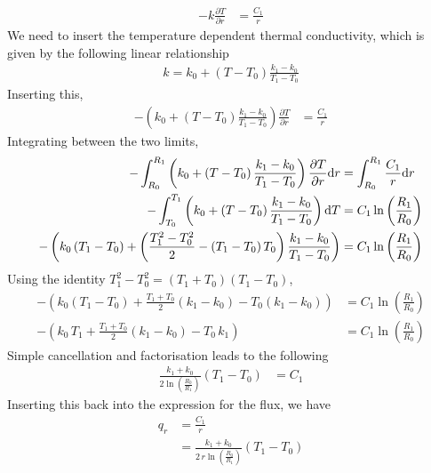 \documentclass[calculator,datasheet,handbook]{exam}
\begin{document}
\begin{question}
\begin{enumerate}[a)]
{      \begin{align*}
        -k \frac{\partial T}{\partial r} &= \frac{C_1}{r}
      \end{align*}
      We need to insert the temperature dependent thermal
      conductivity, which is given by the following linear relationship
      \begin{align*}
        k = k_{0} + \left(T-T_{0}\right)\frac{k_{1}-k_{0}}{T_{1}-T_{0}}
      \end{align*}
      Inserting this,
      \begin{align*}
        -\left(k_{0} + \left(T-T_{0}\right)\frac{k_{1}-k_{0}}{T_{1}-T_{0}}\right) \frac{\partial T}{\partial r} &= \frac{C_1}{r}
      \end{align*}
      Integrating between the two limits,
      \begin{align*}
        -\int_{R_{0}}^{R_{1}}\left(k_{0} + \left(T-T_{0}\right)\frac{k_{1}-k_{0}}{T_{1}-T_{0}}\right) \frac{\partial T}{\partial r}{\rm d}r&= \int_{R_{0}}^{R_{1}}\frac{C_1}{r}{\rm d}r\\
        -\int_{T_{0}}^{T_{1}}\left(k_{0} + \left(T-T_{0}\right)\frac{k_{1}-k_{0}}{T_{1}-T_{0}}\right){\rm d}T&= C_1\ln\left(\frac{R_{1}}{R_{0}}\right)\\
        -\left(k_{0}\left(T_{1}-T_{0}\right) + \left(\frac{T_{1}^2-T_{0}^2}{2}-\left(T_{1}-T_{0}\right)T_{0}\right)\frac{k_{1}-k_{0}}{T_{1}-T_{0}}\right)&= C_1\ln\left(\frac{R_{1}}{R_{0}}\right)
      \end{align*}
      Using the identity $T_{1}^2-T_{0}^2=(T_{1}+T_{0})(T_{1}-T_{0})$,
      \begin{align*}
        -\left(k_{0}\left(T_{1}-T_{0}\right) + \frac{T_{1}+T_{0}}{2}(k_{1}-k_{0})-T_{0}(k_{1}-k_{0})\right)&= C_1\ln\left(\frac{R_{1}}{R_{0}}\right)\\
        -\left(k_{0}\,T_{1} + \frac{T_{1}+T_{0}}{2}(k_{1}-k_{0})-T_{0}\,k_{1}\right)&= C_1\ln\left(\frac{R_{1}}{R_{0}}\right)
      \end{align*}
      Simple cancellation and factorisation leads to the following
      \begin{align*}
        \frac{k_{1}+k_{0}}{2\ln\left(\frac{R_{0}}{R_{1}}\right)}(T_{1}-T_{0})&= C_1
      \end{align*}
      Inserting this back into the expression for the flux, we have
      \begin{align*}
        q_r &= \frac{C_1}{r}\\
            &= \frac{k_{1}+k_{0}}{2\,r\ln\left(\frac{R_{0}}{R_{1}}\right)}(T_{1}-T_{0})

\end{align*}}
\end{enumerate}
\end{question}
\end{document}
